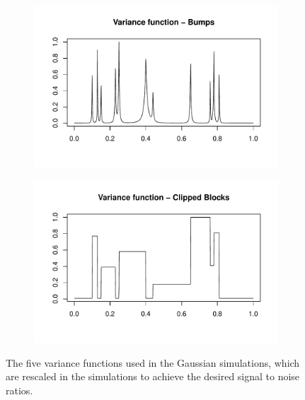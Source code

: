 \documentclass[12pt]{article}
\begin{document}
\begin{figure}
\begin{subfigure}[b]{0.48\textwidth}
        \caption{}
        \label{fig:gaus_var_dop}
    \end{subfigure}
		\hfill
    \begin{subfigure}[b]{0.48\textwidth}
        \centering
        \includegraphics[width=\textwidth]{gaus_var_bump.pdf}
        \caption{}
        \label{fig:gaus_var_bump}
    \end{subfigure}
		\hfill
    \begin{subfigure}[b]{0.48\textwidth}
        \centering
        \includegraphics[width=\textwidth]{gaus_var_cblk.pdf}
        \caption{}
        \label{fig:gaus_var_cblk}
    \end{subfigure}
    \caption{The five variance functions used in the Gaussian simulations, which are rescaled in the simulations to achieve the desired signal to noise ratios.}
    \label{fig:gaus_var}
\end{figure}
\end{document}
